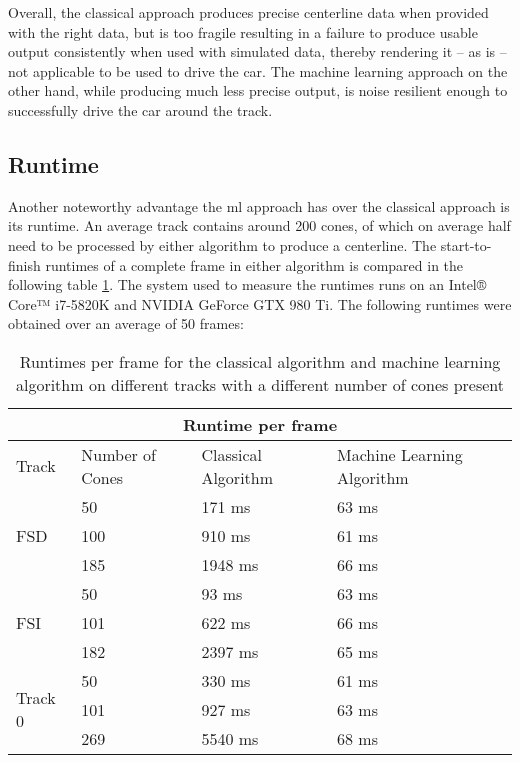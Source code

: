 Overall, the classical approach produces precise centerline data when provided with the right data, but is too fragile resulting in a failure to produce usable output consistently when used with simulated data, thereby rendering it – as is – not applicable to be used to drive the car. The machine learning approach on the other hand, while producing much less precise output, is noise resilient enough to successfully drive the car around the track.

\subsection{Runtime}
Another noteworthy advantage the \ac{ml} approach has over the classical approach is its runtime. An average track contains around 200 cones, of which on average half need to be processed by either algorithm to produce a centerline. The start-to-finish runtimes of a complete frame in either algorithm is compared in the following table \ref{table:2}. The system used to measure the runtimes runs on an Intel® Core™ i7-5820K and NVIDIA GeForce GTX 980 Ti. The following runtimes were obtained over an average of 50 frames:\pagebreak
\begin{table}[h!]
\centering
\begin{tabular}{ |p{1.5cm} p{3cm}||p{4cm}|p{5cm}|  }
    \hline
    \multicolumn{4}{|c|}{Runtime per frame} \\
    \hline
    Track  & Number of Cones  & Classical Algorithm & Machine Learning Algorithm\\
    \hline
    \hline

    \multirow{3}{*}{FSD} & 50  & 171 ms & 63 ms \\
                         & 100 & 910 ms & 61 ms\\
                         & 185 & 1948 ms & 66 ms\\ 
                         \hline
    \multirow{3}{*}{FSI} & 50  & 93 ms & 63 ms\\
                         & 101 & 622 ms & 66 ms\\
                         & 182 & 2397 ms & 65 ms\\ 
                         \hline
    \multirow{3}{*}{Track 0} & 50  & 330 ms & 61 ms\\
                             & 101 & 927 ms & 63 ms\\
                             & 269 & 5540 ms & 68 ms\\ 
                             \hline
   \end{tabular}
\caption{Runtimes per frame for the classical algorithm and machine learning algorithm on different tracks with a different number of cones present}
\label{table:2}
\end{table}
